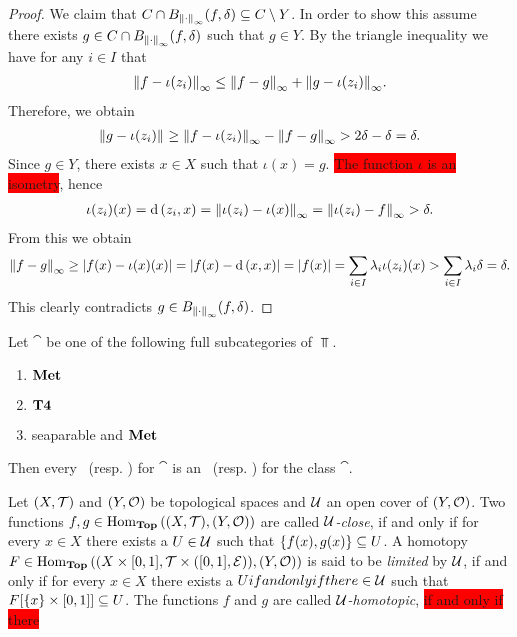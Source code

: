 \begin{proof}
	We claim that $C \cap B_{\norm[\infty]{\cdot}}\pbraces{f, \delta} \subseteq C \setminus Y$. In order to show this assume there exists $g \in C \cap B_{\norm[\infty]{\cdot}}\pbraces{f, \delta}$ such that $g \in Y$.  By the triangle inequality we have for any $i \in I$ that
	\begin{align*}
		\norm[\infty]{f - \iota(z_i)} \leq \norm[\infty]{f - g} + \norm[\infty]{g - \iota(z_i)}.
	\end{align*}
	Therefore, we obtain
	\begin{align*}
		\norm{g - \iota(z_i)} \geq \norm[\infty]{f - \iota(z_i)} - \norm[\infty]{f - g} > 2\delta - \delta = \delta.
	\end{align*}
	Since $g \in Y$, there exists $x \in X$ such that $\iota(x) = g$. \colorbox{red}{The function $\iota$ is an isometry}, hence
	\begin{align*}
		\iota(z_i)(x) = \metric\pbraces{z_i, x} = \norm[\infty]{\iota(z_i) - \iota(x)} = \norm[\infty]{\iota(z_i) - f} > \delta.
	\end{align*}
	From this we obtain
	\begin{align*}
		\norm[\infty]{f - g} \geq \vbraces{f(x) - \iota(x)(x)} = \vbraces{f(x) - \metric\pbraces{x, x}} = \vbraces{f(x)} = \sum_{i \in I} \lambda_i \iota(z_i)(x) > \sum_{i \in I} \lambda_i \delta = \delta.
	\end{align*}
	This clearly contradicts $g \in B_{\norm[\infty]{\cdot}}\pbraces{f, \delta}$. 
\end{proof}

\begin{theorem}\cite[p. 84]{ToR} \label{theorem:anr_to_ane}
	Let $\cat$ be one of the following full subcategories of $\Top$.
	\begin{enumerate}
		\item $\Met$
		\item $\Normal$
		\item seaparable and $\Met$
	\end{enumerate}
	Then every \anr\ (resp. \ar) for $\cat$ is an \ane\ (resp. \aex) for the class $\cat$. 
\end{theorem}

\begin{definition}
	Let $\tspace$ and $\tspace[Y][O]$ be topological spaces and $\cover$ an open cover of $\tspace[Y][O]$. Two functions $f,g \in \Hom_\Top\pbraces{\tspace, \tspace[Y][O]}$ are called $\cover$\textit{-close}, if and only if for every $x \in X$ there exists a $U \in \cover$ such that $\Bbraces{f(x), g(x)} \subseteq U$. A homotopy $F \in \Hom_\Top\pbraces{\prodtspace, \tspace[Y][O]}$ is said to be \textit{limited} by $\cover$, if and only if for every $x \in X$ there exists a $Uif and only if there   \in \cover$ such that $F\bbraces{\Bbraces{x} \times \bbraces{0, 1}} \subseteq U$. The functions $f$ and $g$ are called $\cover$\textit{-homotopic}, \colorbox{red}{if and only if there}
\end{definition}

